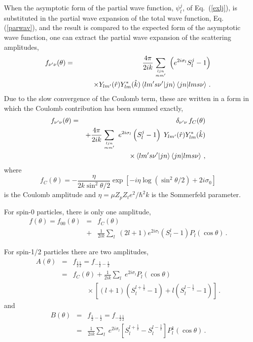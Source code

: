 \documentclass[twocolumn,amsmath,amssymb,10pt,groupedaddress,letter]{revtex4}
\begin{document}
When the asymptotic form of the partial wave function, $\psi_{l}^{j}$,
of Eq.~(\ref{exlj}), is substituted in the partial wave expansion
of the total wave function, Eq. (\ref{parwav}), and the result is
compared to the expected form of the asymptotic wave function,
one can extract the partial wave expansion of the scattering amplitudes,
\begin{eqnarray}
f_{\nu^{\prime}\nu}(\theta) & = & \frac{4\pi}{2ik}\sum_{{{ljn\atop mm^{\prime}}}}\;\left(e^{2i\sigma_{l}}S_{l}^{j}-1\right)\\
 &  & \qquad\times Y_{lm^{\prime}}(\hat{r})Y_{lm}^{*}(\hat{k})\left\langle lm^{\prime}s\nu^{\prime}|jn\right\rangle \left\langle jn|lms\nu\right\rangle \,.\nonumber\end{eqnarray}
 Due to the slow convergence of the Coulomb term, these are written
in a form in which the Coulomb contribution has been summed exactly,\begin{eqnarray}
f_{\nu^{\prime}\nu}(\theta) & = & \delta_{\nu^{\prime}\nu}\,
 f_{C}(\theta) \\
& & +\frac{4\pi}{2ik}\sum_{{{ljn\atop mm^{\prime}}}}\; e^{2i\sigma_{l}}\left(S_{l}^{j}-1\right)\; Y_{lm^{\prime}}(\hat{r})Y_{lm}^{*}(\hat{k})\nonumber \\
 &  & \qquad\qquad\times\left\langle
 lm^{\prime}s\nu^{\prime}|jn\right\rangle \left\langle
 jn|lms\nu\right\rangle \,,\nonumber \end{eqnarray}
 where \begin{equation}
f_{C}(\theta)=-\frac{\eta}{2k\sin^{2}\theta/2}\exp\left[-i\eta\log\left(\sin^{2}\theta/2\right)+2i\sigma_{0}\right]\end{equation}
 is the Coulomb amplitude and $\eta=\mu Z_p Z_t e^2/\hbar^2 k $ is the
 Sommerfeld parameter.

For spin-0 particles, there is only one amplitude, \begin{eqnarray}
f(\theta)=f_{00}(\theta) & = & f_{C}(\theta)\\
 & + & \frac{1}{2ik}\sum_{l}\;(2l+1)e^{2i\sigma_{l}}(S_{l}^{l}-1)P_{l}(\cos\theta)\,.\nonumber \end{eqnarray}


For spin-1/2 particles there are two amplitudes, \begin{eqnarray}
A(\theta) & = & f_{\frac{1}{2}\frac{1}{2}}=f_{-\frac{1}{2}-\frac{1}{2}}\\
 & = & f_{C}(\theta)+\frac{1}{2ik}\sum_{l}\; e^{2i\sigma_{l}}P_{l}(\cos\theta)\nonumber \\
 &  & \qquad\times\left[(l+1)(S_{l}^{l+\frac{1}{2}}-1)+l(S_{l}^{l-\frac{1}{2}}-1)\right]\,.\nonumber\end{eqnarray}
 and \begin{eqnarray}
B(\theta) & = & f_{\frac{1}{2}-\frac{1}{2}}=f_{-\frac{1}{2}\frac{1}{2}}\\
 & = & \frac{1}{2ik}\sum_{l}\; e^{2i\sigma_{l}}\left[S_{l}^{l+\frac{1}{2}}-S_{l}^{l-\frac{1}{2}}\right]P_{l}^{1}(\cos\theta)\,.\nonumber \end{eqnarray}
\end{document}
